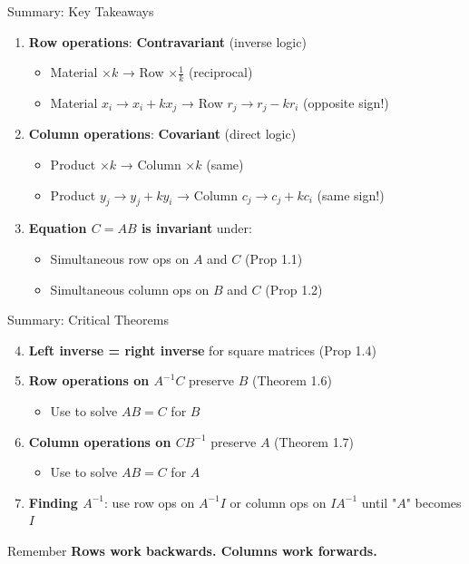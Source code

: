 \documentclass[10pt]{beamer}
\theoremstyle{definition}
\newcommand{\x}[1]{\alert{\textbf{#1}}}
\begin{document}
\begin{frame}{Summary: Key Takeaways}
\begin{enumerate}
\item \textbf{Row operations}: \x{Contravariant} (inverse logic)
   \begin{itemize}
   \item Material $\times k$ → Row $\times \frac{1}{k}$ (reciprocal)
   \item Material $x_i \to x_i + kx_j$ → Row $r_j \to r_j - kr_i$ (opposite sign!)
   \end{itemize}

\item \textbf{Column operations}: \x{Covariant} (direct logic)
   \begin{itemize}
   \item Product $\times k$ → Column $\times k$ (same)
   \item Product $y_j \to y_j + ky_i$ → Column $c_j \to c_j + kc_i$ (same sign!)
   \end{itemize}

\item \textbf{Equation $C = AB$ is invariant} under:
   \begin{itemize}
   \item Simultaneous row ops on $A$ and $C$ (Prop 1.1)
   \item Simultaneous column ops on $B$ and $C$ (Prop 1.2)
   \end{itemize}
\end{enumerate}
\end{frame}

\begin{frame}{Summary: Critical Theorems}
\begin{enumerate}
\setcounter{enumi}{3}
\item \textbf{Left inverse = right inverse} for square matrices (Prop 1.4)

\item \textbf{Row operations on $A^{-1}C$} preserve $B$ (Theorem 1.6)
   \begin{itemize}
   \item Use to solve $AB = C$ for $B$
   \end{itemize}

\item \textbf{Column operations on $CB^{-1}$} preserve $A$ (Theorem 1.7)
   \begin{itemize}
   \item Use to solve $AB = C$ for $A$
   \end{itemize}

\item \textbf{Finding $A^{-1}$}: use row ops on $A^{-1}I$ or column ops on $IA^{-1}$ until "$A$" becomes $I$
\end{enumerate}

\vspace{0.5cm}
\begin{alertblock}{Remember}
\textbf{Rows work backwards. Columns work forwards.}
\end{alertblock}
\end{frame}
\end{document}
